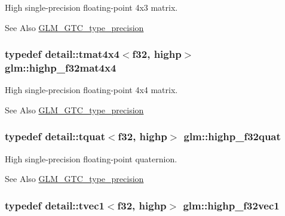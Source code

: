 High single-\/precision floating-\/point 4x3 matrix. \begin{DoxySeeAlso}{See Also}
\hyperlink{group__gtc__type__precision}{G\-L\-M\-\_\-\-G\-T\-C\-\_\-type\-\_\-precision} 
\end{DoxySeeAlso}
\hypertarget{group__gtc__type__precision_gafe24f12e4f5453058caea3f583ad7d9c}{
\subsubsection[{highp\-\_\-f32mat4x4}]{\setlength{\rightskip}{0pt plus 5cm}typedef detail\-::tmat4x4$<$f32, highp$>$ {\bf glm\-::highp\-\_\-f32mat4x4}}}\label{group__gtc__type__precision_gafe24f12e4f5453058caea3f583ad7d9c}
High single-\/precision floating-\/point 4x4 matrix. \begin{DoxySeeAlso}{See Also}
\hyperlink{group__gtc__type__precision}{G\-L\-M\-\_\-\-G\-T\-C\-\_\-type\-\_\-precision} 
\end{DoxySeeAlso}
\hypertarget{group__gtc__type__precision_ga26eef27d2efbd759e7e93c40672402e9}{
\subsubsection[{highp\-\_\-f32quat}]{\setlength{\rightskip}{0pt plus 5cm}typedef detail\-::tquat$<$f32, highp$>$ {\bf glm\-::highp\-\_\-f32quat}}}\label{group__gtc__type__precision_ga26eef27d2efbd759e7e93c40672402e9}
High single-\/precision floating-\/point quaternion. \begin{DoxySeeAlso}{See Also}
\hyperlink{group__gtc__type__precision}{G\-L\-M\-\_\-\-G\-T\-C\-\_\-type\-\_\-precision} 
\end{DoxySeeAlso}
\hypertarget{group__gtc__type__precision_gac8be8ce31b9df0a5005d7c7458a3d03e}{
\subsubsection[{highp\-\_\-f32vec1}]{\setlength{\rightskip}{0pt plus 5cm}typedef detail\-::tvec1$<$f32, highp$>$ {\bf glm\-::highp\-\_\-f32vec1}}}\label{group__gtc__type__precision_gac8be8ce31b9df0a5005d7c7458a3d03e}
